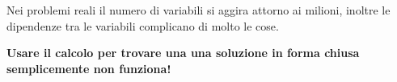 \begin{figure}[!h]
\centering     %
{}
\end{figure}


Nei problemi reali il numero di variabili si aggira attorno ai milioni, inoltre le dipendenze tra le variabili complicano di molto le cose.


\textbf{Usare il calcolo per trovare una una soluzione in forma chiusa semplicemente non funziona!}


